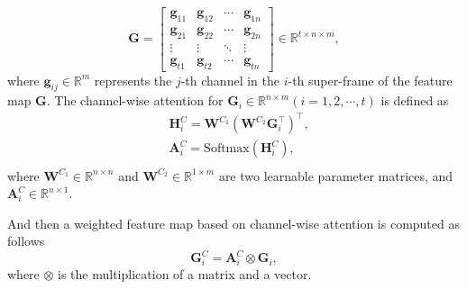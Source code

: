 \documentclass[letterpaper]{article} \usepackage{aaai20}  \usepackage{times}  \usepackage{helvet} \usepackage{courier}  \usepackage[hyphens]{url}  \usepackage{graphicx} \urlstyle{rm} \def\UrlFont{\rm}  \usepackage{graphicx}
\begin{document}
\begin{equation}\textbf{G} = \left[ {\begin{array}{*{20}{c}}
{{\textbf{g}_{11}}}&{{\textbf{g}_{12}}}& \cdots &{{\textbf{g}_{1n}}}\\
{{\textbf{g}_{21}}}&{{\textbf{g}_{22}}}& \cdots &{{\textbf{g}_{2n}}}\\
 \vdots & \vdots & \ddots & \vdots \\
{{\textbf{g}_{t1}}}&{{\textbf{g}_{t2}}}& \cdots &{{\textbf{g}_{tn}}}
\end{array}} \right] \in {\mathbb{R}^{t \times n \times m}},
\end{equation}
where $\textbf{g}_{ij}\in \mathbb{R}^m$ represents the $j$-th channel in the $i$-th super-frame of the feature map $\textbf{G}$. The channel-wise attention for ${\textbf{G}_i \in \mathbb{R}^{n \times m}}(i = 1,2, \cdots ,t)$ is defined as
\begin{equation}\begin{aligned}
&{\textbf{H}_i^C} = {\textbf{W}^{C_1}}{({\textbf{W}^{C_2}}{\textbf{G}_i^ \top})^ \top },\\
&\textbf{A}_i^C=\text{Softmax}(\textbf{H}_i^C),\\
\end{aligned}
\end{equation}
where $\textbf{W}^{C_1}\in\mathbb{R}^{n\times n}$ and $\textbf{W}^{C_2}\in\mathbb{R}^{1\times m}$ are two learnable parameter matrices, and $\textbf{A}_i^C \in \mathbb{R}^{ n \times 1}$.

And then a weighted feature map based on channel-wise attention is computed as follows
\begin{equation}\textbf{G}_i^C=\textbf{A}_{i}^C\otimes\textbf{G}_{i},
\end{equation}
where $\otimes$ is the multiplication of a matrix and a vector.
\end{document}
